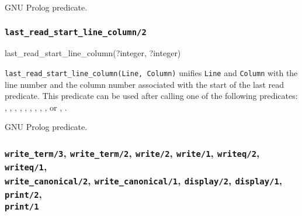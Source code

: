 \Portability

GNU Prolog predicate.

\subsubsection{\texttt{last\_read\_start\_line\_column/2}}

\begin{TemplatesOneCol}
last\_read\_start\_line\_column(?integer, ?integer)

\end{TemplatesOneCol}

\Description

\texttt{last\_read\_start\_line\_column(Line, Column)} unifies \texttt{Line}
and \texttt{Column} with the line number and the column number associated with
the start of the last read predicate. This predicate can be used after
calling one of the following predicates: ,
, , 
, , ,
, , ,
  or ,
 .

\begin{PlErrors}



\end{PlErrors}

\Portability

GNU Prolog predicate.

\subsubsection{\texttt{write\_term/3},
               \texttt{write\_term/2},
               \texttt{write/2},
               \texttt{write/1},
               \texttt{writeq/2},
               \texttt{writeq/1}, \\
               \texttt{write\_canonical/2},
               \texttt{write\_canonical/1},
               \texttt{display/2},
               \texttt{display/1},
               \texttt{print/2}, \\
               \texttt{print/1}}
\label{write-term/3}

